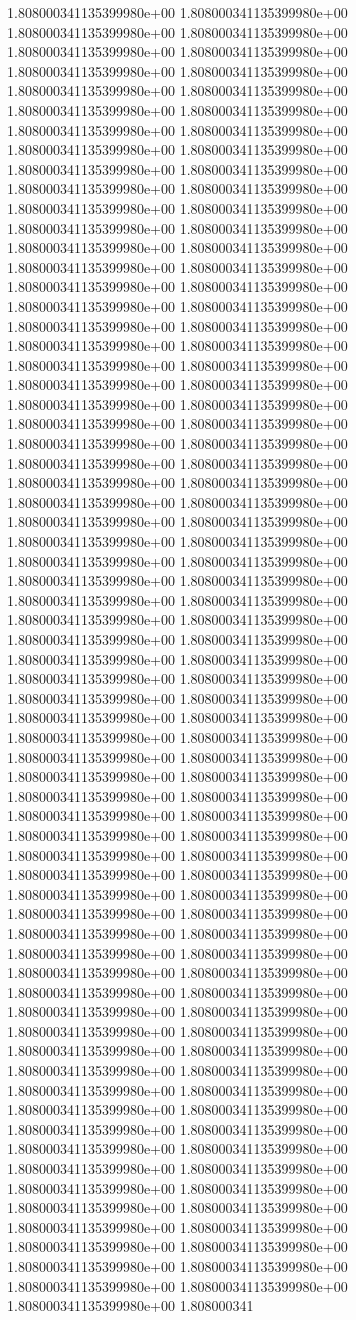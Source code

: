 1.808000341135399980e+00	1.808000341135399980e+00	1.808000341135399980e+00	1.808000341135399980e+00	1.808000341135399980e+00	1.808000341135399980e+00	1.808000341135399980e+00	1.808000341135399980e+00	1.808000341135399980e+00	1.808000341135399980e+00	1.808000341135399980e+00	1.808000341135399980e+00	1.808000341135399980e+00	1.808000341135399980e+00	1.808000341135399980e+00	1.808000341135399980e+00	1.808000341135399980e+00	1.808000341135399980e+00	1.808000341135399980e+00	1.808000341135399980e+00	1.808000341135399980e+00	1.808000341135399980e+00	1.808000341135399980e+00	1.808000341135399980e+00	1.808000341135399980e+00	1.808000341135399980e+00	1.808000341135399980e+00	1.808000341135399980e+00	1.808000341135399980e+00	1.808000341135399980e+00	1.808000341135399980e+00	1.808000341135399980e+00	1.808000341135399980e+00	1.808000341135399980e+00	1.808000341135399980e+00	1.808000341135399980e+00	1.808000341135399980e+00	1.808000341135399980e+00	1.808000341135399980e+00	1.808000341135399980e+00	1.808000341135399980e+00	1.808000341135399980e+00	1.808000341135399980e+00	1.808000341135399980e+00	1.808000341135399980e+00	1.808000341135399980e+00	1.808000341135399980e+00	1.808000341135399980e+00	1.808000341135399980e+00	1.808000341135399980e+00	1.808000341135399980e+00	1.808000341135399980e+00	1.808000341135399980e+00	1.808000341135399980e+00	1.808000341135399980e+00	1.808000341135399980e+00	1.808000341135399980e+00	1.808000341135399980e+00	1.808000341135399980e+00	1.808000341135399980e+00	1.808000341135399980e+00	1.808000341135399980e+00	1.808000341135399980e+00	1.808000341135399980e+00	1.808000341135399980e+00	1.808000341135399980e+00	1.808000341135399980e+00	1.808000341135399980e+00	1.808000341135399980e+00	1.808000341135399980e+00	1.808000341135399980e+00	1.808000341135399980e+00	1.808000341135399980e+00	1.808000341135399980e+00	1.808000341135399980e+00	1.808000341135399980e+00	1.808000341135399980e+00	1.808000341135399980e+00	1.808000341135399980e+00	1.808000341135399980e+00	1.808000341135399980e+00	1.808000341135399980e+00	1.808000341135399980e+00	1.808000341135399980e+00	1.808000341135399980e+00	1.808000341135399980e+00	1.808000341135399980e+00	1.808000341135399980e+00	1.808000341135399980e+00	1.808000341135399980e+00	1.808000341135399980e+00	1.808000341135399980e+00	1.808000341135399980e+00	1.808000341135399980e+00	1.808000341135399980e+00	1.808000341135399980e+00	1.808000341135399980e+00	1.808000341135399980e+00	1.808000341135399980e+00	1.808000341135399980e+00	1.808000341135399980e+00	1.808000341135399980e+00	1.808000341135399980e+00	1.808000341135399980e+00	1.808000341135399980e+00	1.808000341135399980e+00	1.808000341135399980e+00	1.808000341135399980e+00	1.808000341135399980e+00	1.808000341135399980e+00	1.808000341135399980e+00	1.808000341135399980e+00	1.808000341135399980e+00	1.808000341135399980e+00	1.808000341135399980e+00	1.808000341135399980e+00	1.808000341135399980e+00	1.808000341135399980e+00	1.808000341135399980e+00	1.808000341135399980e+00	1.808000341135399980e+00	1.808000341135399980e+00	1.808000341135399980e+00	1.808000341135399980e+00	1.808000341135399980e+00	1.808000341135399980e+00	1.808000341135399980e+00	1.808000341135399980e+00	1.808000341135399980e+00	1.808000341135399980e+00	1.808000341135399980e+00	1.808000341135399980e+00	1.808000341135399980e+00	1.808000341